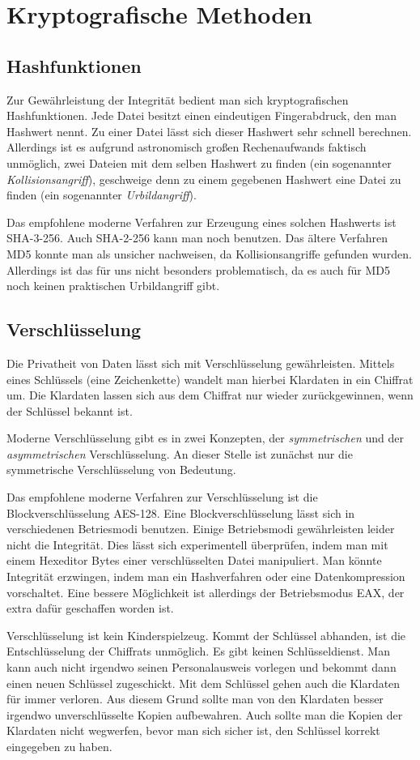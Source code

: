 \documentclass[a4paper,11pt,fleqn,twocolumn,twoside]{scrartcl}
\begin{document}
\section{Kryptografische Methoden}

\subsection{Hashfunktionen}

Zur Gewährleistung der Integrität bedient man sich kryptografischen
Hashfunktionen. Jede Datei besitzt einen eindeutigen Fingerabdruck,
den man Hashwert nennt. Zu einer Datei lässt sich dieser Hashwert
sehr schnell berechnen. Allerdings ist es aufgrund astronomisch großen
Rechenaufwands faktisch unmöglich, zwei Dateien mit dem selben Hashwert
zu finden (ein sogenannter \emph{Kollisionsangriff}), geschweige denn
zu einem gegebenen Hashwert eine Datei zu finden (ein sogenannter
\emph{Urbildangriff}).

Das empfohlene moderne Verfahren zur Erzeugung eines solchen
Hashwerts ist SHA-3-256. Auch SHA-2-256 kann man noch
benutzen. Das ältere Verfahren MD5 konnte man als unsicher
nachweisen, da Kollisionsangriffe gefunden wurden. Allerdings
ist das für uns nicht besonders problematisch, da es auch für MD5
noch keinen praktischen Urbildangriff gibt.

\subsection{Verschlüsselung}

Die Privatheit von Daten lässt sich mit Verschlüsselung
gewährleisten. Mittels eines Schlüssels (eine Zeichenkette)
wandelt man hierbei Klardaten in ein Chiffrat um. Die Klardaten lassen
sich aus dem Chiffrat nur wieder zurückgewinnen, wenn der Schlüssel
bekannt ist.

Moderne Verschlüsselung gibt es in zwei Konzepten, der
\emph{symmetrischen} und der \emph{asymmetrischen} Verschlüsselung.
An dieser Stelle ist zunächst nur die symmetrische Verschlüsselung
von Bedeutung.

Das empfohlene moderne Verfahren zur Verschlüsselung
ist die Blockverschlüsselung AES-128. Eine Blockverschlüsselung
lässt sich in verschiedenen Betriesmodi benutzen. Einige
Betriebsmodi gewährleisten leider nicht die Integrität. Dies lässt
sich experimentell überprüfen, indem man mit einem Hexeditor Bytes
einer verschlüsselten Datei manipuliert. Man könnte Integrität
erzwingen, indem man ein Hashverfahren oder eine Datenkompression
vorschaltet. Eine bessere Möglichkeit ist allerdings der Betriebsmodus
EAX, der extra dafür geschaffen worden ist.

Verschlüsselung ist kein Kinderspielzeug. Kommt der Schlüssel
abhanden, ist die Entschlüsselung der Chiffrats unmöglich.
Es gibt keinen Schlüsseldienst. Man kann auch nicht irgendwo
seinen Personalausweis vorlegen und bekommt dann einen neuen
Schlüssel zugeschickt. Mit dem Schlüssel gehen auch die Klardaten
für immer verloren. Aus diesem Grund sollte man von den Klardaten
besser irgendwo unverschlüsselte Kopien aufbewahren. Auch sollte
man die Kopien der Klardaten nicht wegwerfen, bevor man sich sicher
ist, den Schlüssel korrekt eingegeben zu haben.
\end{document}
